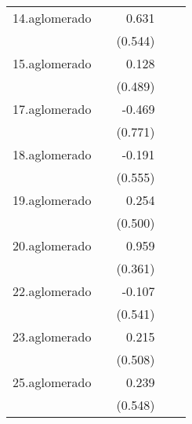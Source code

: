 {\begin{longtable}{l*{4}{D{.}{.}{-1}}}
\addlinespace
14.aglomerado&                     &       0.631         &                     &                     \\
            &                     &     (0.544)         &                     &                     \\
\addlinespace
15.aglomerado&                     &       0.128         &                     &                     \\
            &                     &     (0.489)         &                     &                     \\
\addlinespace
17.aglomerado&                     &      -0.469         &                     &                     \\
            &                     &     (0.771)         &                     &                     \\
\addlinespace
18.aglomerado&                     &      -0.191         &                     &                     \\
            &                     &     (0.555)         &                     &                     \\
\addlinespace
19.aglomerado&                     &       0.254         &                     &                     \\
            &                     &     (0.500)         &                     &                     \\
\addlinespace
20.aglomerado&                     &       0.959\sym{**} &                     &                     \\
            &                     &     (0.361)         &                     &                     \\
\addlinespace
22.aglomerado&                     &      -0.107         &                     &                     \\
            &                     &     (0.541)         &                     &                     \\
\addlinespace
23.aglomerado&                     &       0.215         &                     &                     \\
            &                     &     (0.508)         &                     &                     \\
\addlinespace
25.aglomerado&                     &       0.239         &                     &                     \\
            &                     &     (0.548)         &                     &                     \\

\end{longtable}}

